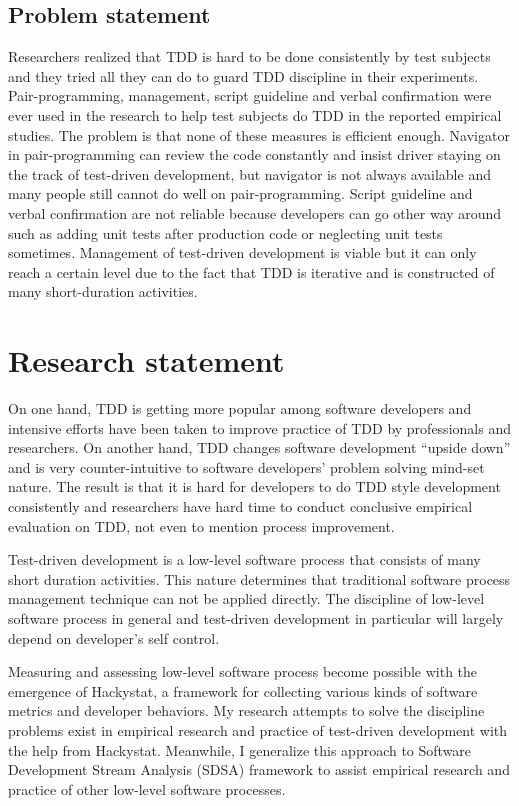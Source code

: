 \subsection{Problem statement}
Researchers realized that TDD is hard to be done consistently by test
subjects and they tried all they can do to guard TDD discipline in their
experiments. Pair-programming, management, script guideline and verbal
confirmation were ever used in the research to help test subjects do TDD in
the reported empirical studies. The problem is that none of these measures
is efficient enough. Navigator in pair-programming can review the code
constantly and insist driver staying on the track of test-driven
development, but navigator is not always available and many people still
cannot do well on pair-programming. Script guideline and verbal
confirmation are not reliable because developers can go other way around
such as adding unit tests after production code or neglecting unit tests
sometimes. Management of test-driven development is viable but it can only
reach a certain level due to the fact that TDD is iterative and is
constructed of many short-duration activities.

\section{Research statement}
On one hand, TDD is getting more popular among software developers and
intensive efforts have been taken to improve practice of TDD by
professionals and researchers\cite{Beck:03,TestDrivenWeb,TddYahooGroup}. On
another hand, TDD changes software development ``upside down''
\cite{Pipka:03} and is very counter-intuitive to software developers'
problem solving mind-set nature. The result is that it is hard for
developers to do TDD style development consistently and researchers have
hard time to conduct conclusive empirical evaluation on TDD, not even to
mention process improvement.

Test-driven development is a low-level software process that consists of
many short duration activities. This nature determines that traditional
software process management technique can not be applied directly.  The
discipline of low-level software process in general and test-driven
development in particular will largely depend on developer's self control.

Measuring and assessing low-level software process become possible with the
emergence of Hackystat\cite{Hackystat}, a framework for collecting various
kinds of software metrics and developer behaviors. My research attempts to
solve the discipline problems exist in empirical research and practice of
test-driven development with the help from Hackystat. Meanwhile, I
generalize this approach to Software Development Stream Analysis (SDSA)
framework to assist empirical research and practice of other low-level
software processes.

